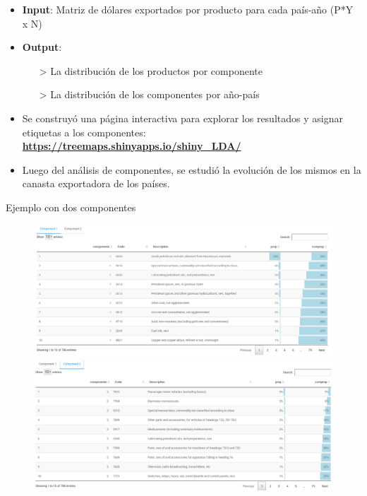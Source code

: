 \documentclass[compress]{beamer}
\begin{document}
\begin{frame}

\begin{itemize}[label=\faRebel]
\item \textbf{Input}: Matriz de dólares exportados por producto para cada país-año (P*Y x N)
\item \textbf{Output}:
\begin{itemize}
\item[>] La distribución de los productos por componente
\item[>] La distribución de los componentes por año-país
\end{itemize}

\item Se construyó una página interactiva para explorar los resultados y asignar etiquetas a los componentes: \textbf{\url{https://treemaps.shinyapps.io/shiny_LDA/}}
\item Luego del análisis de componentes, se estudió la evolución de los mismos en la canasta exportadora de los países.

\end{itemize}
\end{frame}


\begin{frame}
\tiny Ejemplo con dos componentes
\begin{figure}
\centering
\includegraphics[width=0.8\linewidth]{comp1k2}
\includegraphics[width=0.8\linewidth]{comp2k2}	
\end{figure}

\end{frame}
\end{document}
